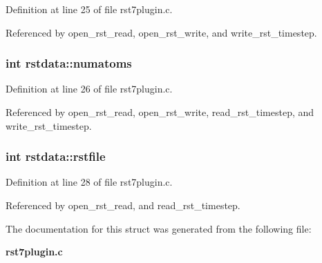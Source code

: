 Definition at line 25 of file rst7plugin.c.

Referenced by open\_\-rst\_\-read, open\_\-rst\_\-write, and write\_\-rst\_\-timestep.
\subsubsection{\setlength{\rightskip}{0pt plus 5cm}int rstdata::numatoms}\label{structrstdata_m2}




Definition at line 26 of file rst7plugin.c.

Referenced by open\_\-rst\_\-read, open\_\-rst\_\-write, read\_\-rst\_\-timestep, and write\_\-rst\_\-timestep.
\subsubsection{\setlength{\rightskip}{0pt plus 5cm}int rstdata::rstfile}\label{structrstdata_m4}




Definition at line 28 of file rst7plugin.c.

Referenced by open\_\-rst\_\-read, and read\_\-rst\_\-timestep.

The documentation for this struct was generated from the following file:\begin{CompactItemize}
\item 
{\bf rst7plugin.c}\end{CompactItemize}
